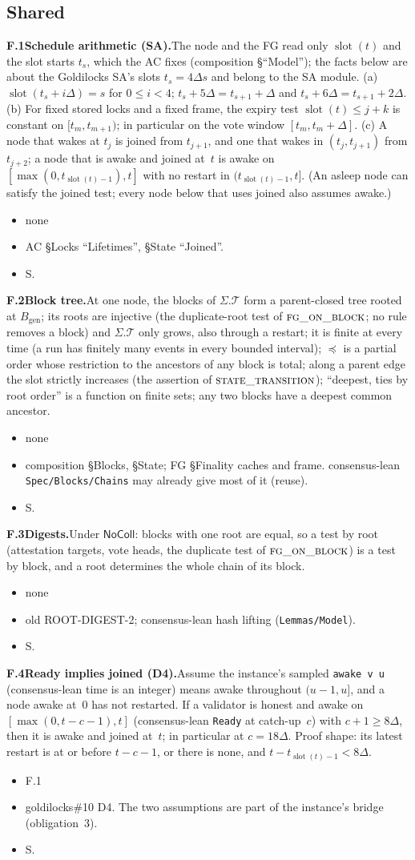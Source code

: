 \documentclass{article}
\newcommand{\genesis}{B_{\mathrm{gen}}}
\newcommand{\slot}{\operatorname{slot}}
\newcommand{\T}{\mathcal T}
\newcommand{\fname}[1]{\text{\textsc{#1}}}
\newcommand{\dagnode}[6]{%
\par\medskip\noindent\textbf{#1\enspace #2.}\enspace #3
\begin{itemize}[leftmargin=2.2em,itemsep=0pt,topsep=2pt]
\item[\emph{Uses}] #4
\item[\emph{Evid.}] #5
\item[\emph{Task}] #6
\end{itemize}}
\begin{document}
\subsection{Shared}

\dagnode{F.1}{Schedule arithmetic (SA)}{The node and the FG read only $\slot(t)$
and the slot starts $t_s$, which the AC fixes (composition \S``Model''); the
facts below are about the Goldilocks SA's slots $t_s=4\Delta s$ and belong to
the SA module.  (a) $\slot(t_s+i\Delta)=s$ for
$0\leq i<4$; $t_s+5\Delta=t_{s+1}+\Delta$ and $t_s+6\Delta=t_{s+1}+2\Delta$.
(b) For fixed stored locks and a fixed frame, the expiry test
$\slot(t)\leq j+k$ is constant on $[t_m,t_{m+1})$; in particular on the vote
window $[t_m,t_m+\Delta]$.  (c) A node that wakes at $t_j$ is joined from
$t_{j+1}$, and one that wakes in $(t_j,t_{j+1})$ from $t_{j+2}$; a node that is awake and joined at~$t$ is awake on
$[\max(0,t_{\slot(t)-1}),t]$ with no restart in $(t_{\slot(t)-1},t]$.  (An
asleep node can satisfy the joined test; every node below that uses joined also
assumes awake.)}
{none}{AC \S Locks ``Lifetimes'', \S State ``Joined''.}{S.}

\dagnode{F.2}{Block tree}{At one node, the blocks of $\Sigma.\T$ form a parent-closed tree rooted at
$\genesis$; its roots are injective (the duplicate-root test of
$\fname{fg\_on\_block}$; no rule removes a block) and $\Sigma.\T$ only grows,
also through a restart; it is finite at every time (a run has finitely many
events in every bounded interval); $\preceq$ is a partial order whose restriction to the ancestors of
any block is total; along a parent edge the slot strictly increases (the
assertion of $\fname{state\_transition}$); ``deepest, ties by root order'' is
a function on finite sets; any two blocks have a deepest common ancestor.}
{none}{composition \S Blocks, \S State; FG \S Finality caches and frame.  consensus-lean \texttt{Spec/Blocks/Chains}
may already give most of it (reuse).}{S.}

\dagnode{F.3}{Digests}{Under $\mathsf{NoColl}$: blocks with one root are
equal, so a test by root (attestation targets, vote heads, the duplicate
test of $\fname{fg\_on\_block}$) is a test by block, and a root determines
the whole chain of its block.}
{none}{old ROOT-DIGEST-2; consensus-lean hash lifting (\texttt{Lemmas/Model}).}{S.}

\dagnode{F.4}{Ready implies joined (D4)}{Assume the instance's sampled
\texttt{awake v u} (consensus-lean time is an integer) means awake throughout
$(u-1,u]$, and a node awake at~$0$ has not restarted.  If a validator is honest
and awake on $[\max(0,t-c-1),t]$ (consensus-lean \texttt{Ready} at catch-up~$c$)
with $c+1\geq8\Delta$, then it is awake and joined at~$t$; in particular at
$c=18\Delta$.  Proof shape: its latest restart is at or before $t-c-1$, or there
is none, and $t-t_{\slot(t)-1}<8\Delta$.}
{F.1}{goldilocks\#10 D4.  The two assumptions are part of the instance's
bridge (obligation~3).}{S.}
\end{document}
